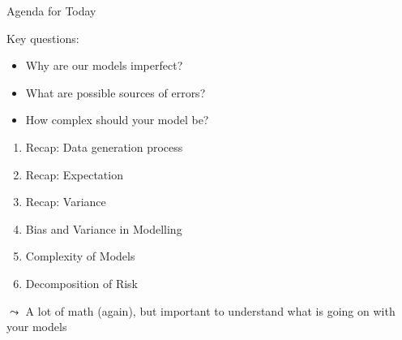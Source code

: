 \documentclass[aspectratio=169]{../latex_main/tntbeamer}  %
\begin{document}
	\begin{frame}{Agenda for Today}

 Key questions: 
    \begin{itemize} 
        \item Why are our models imperfect?
        \item What are possible sources of errors?
        \item How complex should your model be?
    \end{itemize}
            
    \pause
    \medskip
    
    \begin{enumerate}
        \item Recap: Data generation process
        \item Recap: Expectation
        \item Recap: Variance
        \item Bias and Variance in Modelling
        \item Complexity of Models
        \item Decomposition of Risk
    \end{enumerate}

    \pause
    \medskip

    $\leadsto$ A lot of math (again), but important to understand what is going on with your models

	\end{frame}
	
\end{document}
